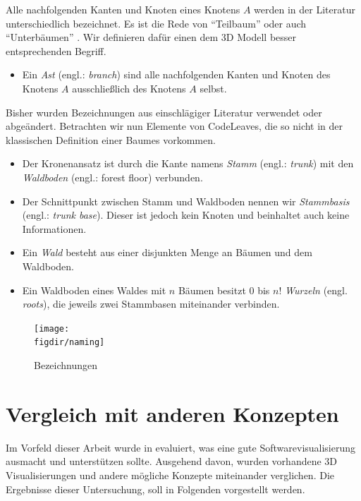 Alle nachfolgenden Kanten und Knoten eines Knotens $A$ werden in der Literatur unterschiedlich bezeichnet. Es ist die Rede von "`Teilbaum"' \cite{ernst2016grundkurs} oder auch "`Unterbäumen"' \cite{gumm2009einfuehrung}. Wir definieren dafür einen dem 3D Modell besser entsprechenden Begriff.

\begin{itemize}
  \item Ein \textit{Ast} (engl.: \textit{branch}) sind alle nachfolgenden Kanten und Knoten des Knotens $A$ ausschließlich des Knotens $A$ selbst.
\end{itemize}

Bisher wurden Bezeichnungen aus einschlägiger Literatur verwendet oder abgeändert. Betrachten wir nun Elemente von CodeLeaves, die so nicht in der klassischen Definition einer Baumes vorkommen.

\begin{itemize}
  \item Der Kronenansatz ist durch die Kante namens \textit{Stamm} (engl.: \textit{trunk}) mit den \textit{Waldboden} (engl.: forest floor) verbunden.
  \item Der Schnittpunkt zwischen Stamm und Waldboden nennen wir \textit{Stammbasis} (engl.: \textit{trunk base}). Dieser ist jedoch kein Knoten und beinhaltet auch keine Informationen.
  \item Ein \textit{Wald} besteht aus einer disjunkten Menge an Bäumen und dem Waldboden.
  \item Ein Waldboden eines Waldes mit $n$ Bäumen besitzt $0$ bis $n!$ \textit{Wurzeln} (engl. \textit{roots}), die jeweils zwei Stammbasen miteinander verbinden.
\end{itemize}

\begin{figure}[htb]
  \texttt{[image: \\figdir/naming]}
  \caption{Bezeichnungen}
  \label{fig:naming}
\end{figure}

\section{Vergleich mit anderen Konzepten}
\label{sec:comparison}

Im Vorfeld dieser Arbeit wurde in \cite{puetz2017softwarevisualisierung} evaluiert, was eine gute Softwarevisualisierung ausmacht und unterstützen sollte. Ausgehend davon, wurden vorhandene 3D Visualisierungen und andere mögliche Konzepte miteinander verglichen. Die Ergebnisse dieser Untersuchung, soll in Folgenden vorgestellt werden.

